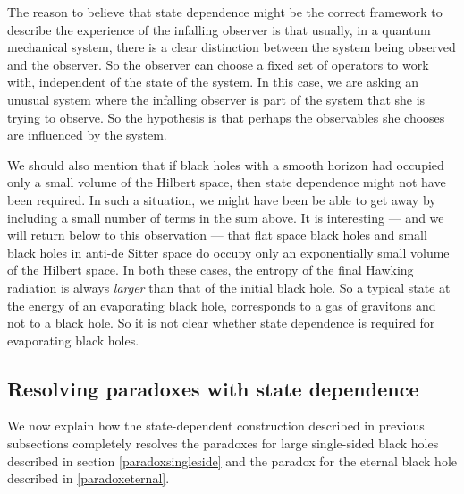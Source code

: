 \documentclass[12pt]{article}
\begin{document}
The reason to believe that state dependence might be the correct framework to describe the experience of the infalling observer is that  usually, in a quantum mechanical system, there is a clear distinction between the system being observed and the observer. So the observer can choose a fixed set of operators to work with, independent of the state of the system. In this case, we are asking an unusual system where the infalling observer is part of the system that she is trying to observe. So the hypothesis is that perhaps the observables she chooses are influenced by the system.



We should also mention that if black holes with a smooth horizon had occupied only a small volume of the Hilbert space, then state dependence might not have been required. In such a situation, we might have been be able to get away by including a small number of terms in the sum above.   It is interesting --- and we will return below to this observation --- that  flat space black holes  and small black holes in anti-de Sitter space do occupy only an exponentially small volume of the Hilbert space. In both these cases, the entropy of the final Hawking radiation is always {\em larger} than that of the initial black hole. So a typical state at the energy of an evaporating black hole,  corresponds to  a gas of gravitons and not to a black hole.  So it is not clear whether state dependence is required for evaporating black holes.









\subsection{Resolving paradoxes with state dependence \label{secresolvestatedep}}
We now explain how the state-dependent construction described in previous subsections completely resolves the paradoxes for large single-sided black holes described in section \ref{paradoxsingleside} and 
the paradox for the eternal black hole described in \ref{paradoxeternal}.
\end{document}
